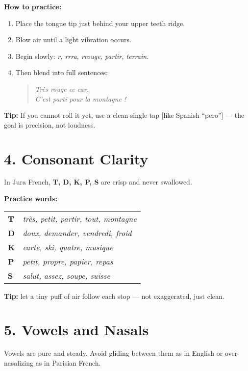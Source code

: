 \documentclass[11pt,a4paper]{article}
\begin{document}
\textbf{How to practice:}
\begin{enumerate}
  \item Place the tongue tip just behind your upper teeth ridge.
  \item Blow air until a light vibration occurs.
  \item Begin slowly: \textit{r, rrra, rrouge, partir, terrain.}
  \item Then blend into full sentences:
    \begin{quote}
      \textit{Très rouge ce car.}\\
      \textit{C’est parti pour la montagne !}
    \end{quote}
\end{enumerate}

\textbf{Tip:} 
If you cannot roll it yet, use a clean single tap [like Spanish “pero”] — the goal is precision, not loudness.

\vspace{0.5em}

\section*{4. Consonant Clarity}

In Jura French, \textbf{T, D, K, P, S} are crisp and never swallowed.

\textbf{Practice words:}
\begin{tabular}{>{\bfseries}m{3cm}m{9cm}}
T & \textit{très, petit, partir, tout, montagne} \\
D & \textit{doux, demander, vendredi, froid} \\
K & \textit{carte, ski, quatre, musique} \\
P & \textit{petit, propre, papier, repas} \\
S & \textit{salut, assez, soupe, suisse} \\
\end{tabular}

\vspace{0.5em}
\textbf{Tip:} let a tiny puff of air follow each stop — not exaggerated, just clean.

\vspace{0.5em}

\section*{5. Vowels and Nasals}

Vowels are pure and steady. 
Avoid gliding between them as in English or over-nasalizing as in Parisian French.
\end{document}
